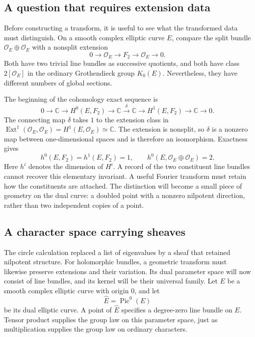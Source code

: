 \documentclass[11pt]{article}
\theoremstyle{remark}
\newcommand{\C}{\mathbb C}
\begin{document}
\subsection{A question that requires extension data}

Before constructing a transform, it is useful to see what the transformed data must distinguish. On a smooth complex elliptic curve \(E\), compare the split bundle \(\mathcal O_E\oplus\mathcal O_E\) with a nonsplit extension
\begin{equation}
0\longrightarrow\mathcal O_E\longrightarrow F_2
\longrightarrow\mathcal O_E\longrightarrow0.
\label{categorical:f2}
\end{equation}
Both have two trivial line bundles as successive quotients, and both have class \(2[\mathcal O_E]\) in the ordinary Grothendieck group \(K_0(E)\). Nevertheless, they have different numbers of global sections.

The beginning of the cohomology exact sequence is
\[
0\longrightarrow\C\longrightarrow H^0(E,F_2)
\longrightarrow\C\xrightarrow{\ \delta\ }\C
\longrightarrow H^1(E,F_2)\longrightarrow\C\longrightarrow0.
\]
The connecting map \(\delta\) takes \(1\) to the extension class in
\(\operatorname{Ext}^1(\mathcal O_E,\mathcal O_E)=H^1(E,\mathcal O_E)\simeq\C\).
The extension is nonsplit, so \(\delta\) is a nonzero map between one-dimensional spaces and is therefore an isomorphism. Exactness gives
\begin{equation}
h^0(E,F_2)=h^1(E,F_2)=1,
\qquad
h^0(E,\mathcal O_E\oplus\mathcal O_E)=2.
\label{categorical:extension-sections}
\end{equation}
Here \(h^i\) denotes the dimension of \(H^i\). A record of the two constituent line bundles cannot recover this elementary invariant. A useful Fourier transform must retain how the constituents are attached. The distinction will become a small piece of geometry on the dual curve: a doubled point with a nonzero nilpotent direction, rather than two independent copies of a point.

\subsection{A character space carrying sheaves}

The circle calculation replaced a list of eigenvalues by a sheaf that retained nilpotent structure. For holomorphic bundles, a geometric transform must likewise preserve extensions and their variation. Its dual parameter space will now consist of line bundles, and its kernel will be their universal family. Let \(E\) be a smooth complex elliptic curve with origin \(0\), and let
\[
\widehat E=\operatorname{Pic}^0(E)
\]
be its dual elliptic curve. A point of \(\widehat E\) specifies a degree-zero line bundle on \(E\). Tensor product supplies the group law on this parameter space, just as multiplication supplies the group law on ordinary characters.
\end{document}
